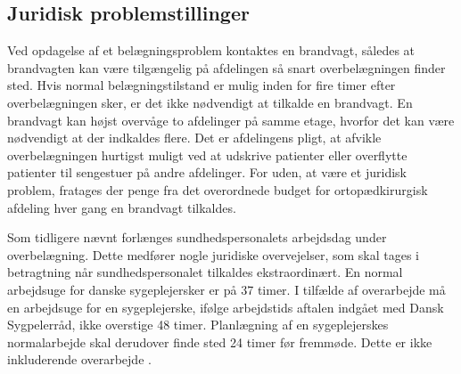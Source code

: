 \subsection{Juridisk problemstillinger}
Ved opdagelse af et belægningsproblem kontaktes en brandvagt, således at brandvagten kan være tilgængelig på afdelingen så snart overbelægningen finder sted. Hvis normal belægningstilstand er mulig inden for fire timer efter overbelægningen sker, er det ikke nødvendigt at tilkalde en brandvagt. En brandvagt kan højst overvåge to afdelinger på samme etage, hvorfor det kan være nødvendigt at der indkaldes flere. Det er afdelingens pligt, at  afvikle overbelægningen hurtigst muligt ved at udskrive patienter eller overflytte patienter til sengestuer på andre afdelinger. \cite{Beredskab2016} For uden, at være et juridisk problem, fratages der penge fra det overordnede budget for ortopædkirurgisk afdeling hver gang en brandvagt tilkaldes. \cite{[5] - dette skal undersøges om det er fra det samlede budget?} 

Som tidligere nævnt forlænges sundhedspersonalets arbejdsdag under overbelægning. Dette medfører nogle juridiske overvejelser, som skal tages i betragtning når sundhedspersonalet tilkaldes ekstraordinært. En normal arbejdsuge for danske sygeplejersker er på 37 timer. \cite{Danske2015} I tilfælde af overarbejde må en arbejdsuge for en sygeplejerske, ifølge arbejdstids aftalen indgået med Dansk Sygpelerråd, ikke overstige 48 timer. Planlægning af en sygeplejerskes normalarbejde skal derudover finde sted 24 timer før fremmøde. Dette er ikke inkluderende overarbejde . \cite{Danske2015}










